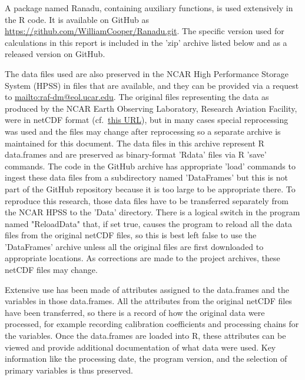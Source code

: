 \documentclass[12pt,twoside,english]{article}\usepackage[]{graphicx}\usepackage[]{color}
\let\OrgIndex\index
\renewcommand*{\index}[1]{\OrgIndex{#1}}
\begin{document}
A package named Ranadu, containing auxiliary functions, is used extensively
in the R code. It is
available on GitHub as \href{https://github.com/WilliamCooper/Ranadu.git}{https://github.com/WilliamCooper/Ranadu.git}. The specific version used for calculations in this
report is included in the 'zip' archive listed below and as a released version on GitHub.

The data files used are also preserved in the NCAR High Performance
Storage System (HPSS) in files that are available, and they can be
provided via a request to \url{mailto:raf-dm@eol.ucar.edu}.
The original files representing the data as produced by the NCAR Earth
Observing Laboratory, Research Aviation Facility, were in netCDF format
(cf.~\href{http://www.unidata.ucar.edu/software/netcdf/}{this URL}),
but in many cases special reprocessing was used and the files may
change after reprocessing so a separate archive is maintained for
this document. The data files in this archive represent R data.frames
and are preserved as binary-format 'Rdata' files via R 'save' commands.
The code in the GitHub archive has appropriate 'load' commands to
ingest these data files from a subdirectory named 'DataFrames' but this
is not part of the GitHub repository because it is too large to be
appropriate there. To reproduce this research, those data files have
to be transferred separately from the NCAR HPSS to the 'Data' directory. 
There is a logical switch in the program named "ReloadData" that, if set true,
causes the program to reload all the data files from the original netCDF
files, so this is best left false to use the 'DataFrames' archive unless
all the original files are first downloaded to appropriate locations. As
corrections are made to the project archives, these netCDF files may change.

Extensive use has been made of attributes assigned to the data.frames
and the variables in those data.frames. All the attributes from the
original netCDF files have been transferred, so there is a record
of how the original data were processed, for example recording%
 calibration
coefficients and processing chains for the variables. Once the data.frames
are loaded into R, these attributes can be viewed and provide additional
documentation of what data were used. Key information like the processing
date, the program version, and the selection of primary variables
is thus preserved.
\end{document}
